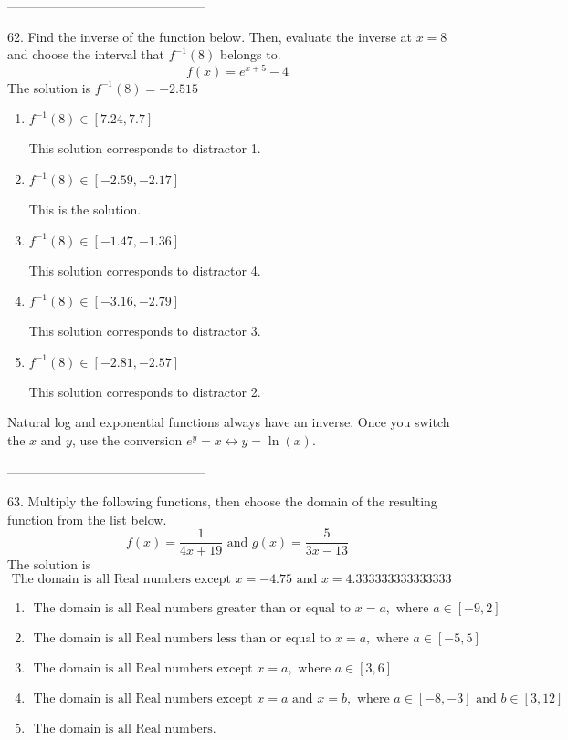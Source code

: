 \documentclass{article}[14pt]
\begin{document}
-----------------------------------------------

62. Find the inverse of the function below. Then, evaluate the inverse at $x = 8$ and choose the interval that $f^{-1}(8)$ belongs to.
$$ f(x) = e^{x+5}-4 $$ 
The solution is $ f^{-1}(8) = -2.515 $ 

\begin{enumerate}[label=\Alph*.] 
\item $ f^{-1}(8) \in [7.24, 7.7] $ 

  This solution corresponds to distractor 1. 
\item $ f^{-1}(8) \in [-2.59, -2.17] $ 

  This is the solution. 
\item $ f^{-1}(8) \in [-1.47, -1.36] $ 

  This solution corresponds to distractor 4. 
\item $ f^{-1}(8) \in [-3.16, -2.79] $ 

  This solution corresponds to distractor 3. 
\item $ f^{-1}(8) \in [-2.81, -2.57] $ 

  This solution corresponds to distractor 2. 
\end{enumerate} 
 
Natural log and exponential functions always have an inverse. Once you switch the $x$ and $y$, use the conversion $ e^y = x \leftrightarrow y=\ln(x)$.

-----------------------------------------------

63. Multiply the following functions, then choose the domain of the resulting function from the list below.
$$ f(x) = \frac{1}{4x+19} \text{ and } g(x) = \frac{5}{3x-13} $$ 
The solution is $ \text{ The domain is all Real numbers except } x = -4.75 \text{ and } x = 4.333333333333333 $ 

\begin{enumerate}[label=\Alph*.] 
\item $ \text{ The domain is all Real numbers greater than or equal to } x = a, \text{ where } a \in [-9, 2] $ 

  
\item $ \text{ The domain is all Real numbers less than or equal to } x = a, \text{ where } a \in [-5, 5] $ 

  
\item $ \text{ The domain is all Real numbers except } x = a, \text{ where } a \in [3, 6] $ 

  
\item $ \text{ The domain is all Real numbers except } x = a \text{ and } x = b, \text{ where } a \in [-8, -3] \text{ and } b \in [3, 12] $ 

  
\item $ \text{ The domain is all Real numbers. } $ 

  
\end{enumerate} 
 
\end{document}
